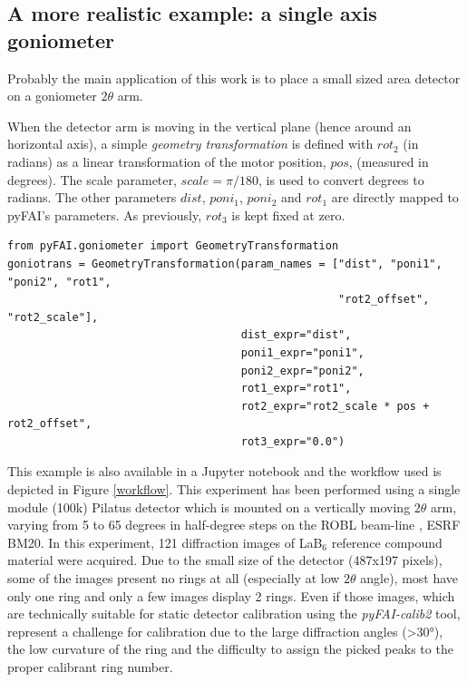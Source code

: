 \documentclass[preprint]{iucr}              %
\begin{document}
\subsection{A more realistic example: a single axis goniometer}

Probably the main application of this work is to place a small sized area detector
on a goniometer $2\theta$ arm. 

When the detector arm is moving in the vertical plane (hence around an horizontal axis), 
a simple \textit{geometry transformation} is defined with $rot_2$ (in radians) as a
linear transformation of the motor position, $pos$, (measured in degrees).
The scale parameter, $scale = \pi / 180$, is used to convert degrees to radians.
The other parameters $dist$, $poni_1$, $poni_2$ and $rot_1$ are directly mapped
to pyFAI's parameters.
As previously, $rot_3$ is kept fixed at zero.

\begin{verbatim}
from pyFAI.goniometer import GeometryTransformation
goniotrans = GeometryTransformation(param_names = ["dist", "poni1", "poni2", "rot1",
                                                   "rot2_offset", "rot2_scale"],
                                    dist_expr="dist", 
                                    poni1_expr="poni1",
                                    poni2_expr="poni2", 
                                    rot1_expr="rot1", 
                                    rot2_expr="rot2_scale * pos + rot2_offset", 
                                    rot3_expr="0.0")
\end{verbatim}


This example is also available in a Jupyter notebook \cite{rotation_pilatus} 
and the workflow used is depicted in Figure \ref{workflow}.
This experiment has been performed using a single module (100k) Pilatus
detector which is mounted on a vertically moving $2\theta$ arm, varying 
from 5 to 65 degrees in half-degree steps on the ROBL beam-line
\cite{Kvashnina:vv5126}, ESRF BM20.
In this experiment, 121 diffraction images of LaB$_6$
reference compound material were acquired.
Due to the small size of the detector (487x197 pixels),
some of the images present no rings at all (especially at low $2\theta$ angle),
most have only one ring and only a few images display 2 rings. 
Even if those images, which are technically suitable for 
static detector calibration using the \textit{pyFAI-calib2} tool,
represent a challenge for calibration due to the large 
diffraction angles (>30°), the low curvature of the ring and the difficulty to 
assign the picked peaks to the proper calibrant ring number.
\end{document}
